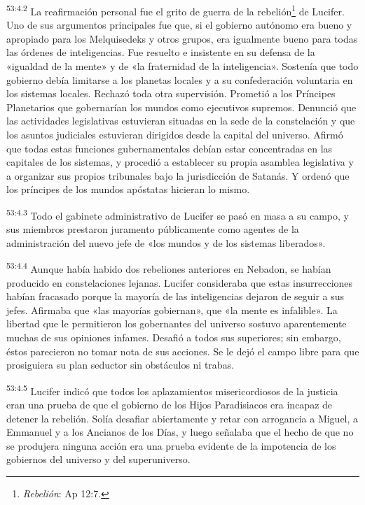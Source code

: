 \par
\textsuperscript{53:4.2} La reafirmación personal fue el grito de guerra de la rebelión\footnote{\textit{Rebelión}: Ap 12:7.} de Lucifer. Uno de sus argumentos principales fue que, si el gobierno autónomo era bueno y apropiado para los Melquisedeks y otros grupos, era igualmente bueno para todas las órdenes de inteligencias. Fue resuelto e insistente en su defensa de la «igualdad de la mente» y de «la fraternidad de la inteligencia». Sostenía que todo gobierno debía limitarse a los planetas locales y a su confederación voluntaria en los sistemas locales. Rechazó toda otra supervisión. Prometió a los Príncipes Planetarios que gobernarían los mundos como ejecutivos supremos. Denunció que las actividades legislativas estuvieran situadas en la sede de la constelación y que los asuntos judiciales estuvieran dirigidos desde la capital del universo. Afirmó que todas estas funciones gubernamentales debían estar concentradas en las capitales de los sistemas, y procedió a establecer su propia asamblea legislativa y a organizar sus propios tribunales bajo la jurisdicción de Satanás. Y ordenó que los príncipes de los mundos apóstatas hicieran lo mismo.

\par
\textsuperscript{53:4.3} Todo el gabinete administrativo de Lucifer se pasó en masa a su campo, y sus miembros prestaron juramento públicamente como agentes de la administración del nuevo jefe de «los mundos y de los sistemas liberados».

\par
\textsuperscript{53:4.4} Aunque había habido dos rebeliones anteriores en Nebadon, se habían producido en constelaciones lejanas. Lucifer consideraba que estas insurrecciones habían fracasado porque la mayoría de las inteligencias dejaron de seguir a sus jefes. Afirmaba que «las mayorías gobiernan», que «la mente es infalible». La libertad que le permitieron los gobernantes del universo sostuvo aparentemente muchas de sus opiniones infames. Desafió a todos sus superiores; sin embargo, éstos parecieron no tomar nota de sus acciones. Se le dejó el campo libre para que prosiguiera su plan seductor sin obstáculos ni trabas.

\par
\textsuperscript{53:4.5} Lucifer indicó que todos los aplazamientos misericordiosos de la justicia eran una prueba de que el gobierno de los Hijos Paradisiacos era incapaz de detener la rebelión. Solía desafiar abiertamente y retar con arrogancia a Miguel, a Emmanuel y a los Ancianos de los Días, y luego señalaba que el hecho de que no se produjera ninguna acción era una prueba evidente de la impotencia de los gobiernos del universo y del superuniverso.

